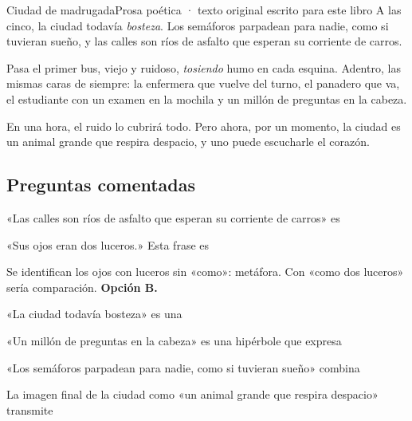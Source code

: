 \begin{texto}{Ciudad de madrugada}{Prosa poética · texto original escrito para este libro}
\pa A las cinco, la ciudad todavía \emph{bosteza}. Los semáforos parpadean para nadie, como si tuvieran sueño, y las
calles son ríos de asfalto que esperan su corriente de carros.

\pa Pasa el primer bus, viejo y ruidoso, \emph{tosiendo} humo en cada esquina. Adentro, las mismas caras de siempre: la
enfermera que vuelve del turno, el panadero que va, el estudiante con un examen en la mochila y un millón de preguntas en
la cabeza.

\pa En una hora, el ruido lo cubrirá todo. Pero ahora, por un momento, la ciudad es un animal grande que respira despacio,
y uno puede escucharle el corazón.
\end{texto}

\subsection{Preguntas comentadas}
\begin{comentada}{«Las calles son ríos de asfalto que esperan su corriente de carros»  es}
\end{comentada}

\begin{reto}
«Sus ojos eran dos luceros.» Esta frase es
\end{reto}

\begin{retoresuelto}
Se identifican los ojos con luceros sin «como»: metáfora. Con «como dos luceros» sería comparación. \textbf{Opción B.}
\end{retoresuelto}

\taller
{}
\begin{ejercicios}
\item «La ciudad todavía bosteza»  es una
\item «Un millón de preguntas en la cabeza»  es una hipérbole que expresa
\item «Los semáforos parpadean para nadie, como si tuvieran sueño» combina
\item La imagen final de la ciudad como «un animal grande que respira despacio» transmite
\end{ejercicios}


